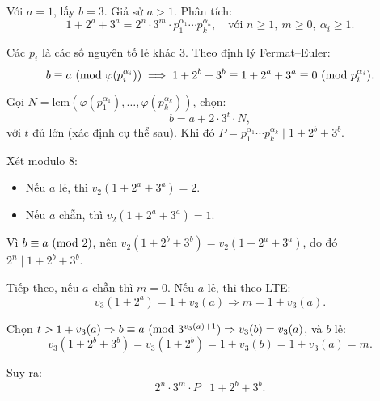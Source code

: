 \documentclass[../09-contruction-methods.tex]{subfiles}
\begin{document}

\newpage

\begin{soln}\footnotemark
    Với \( a = 1 \), lấy \( b = 3 \). Giả sử \( a > 1 \). Phân tích:
    \[
        1 + 2^a + 3^a = 2^n \cdot 3^m \cdot p_1^{\alpha_1} \cdots p_k^{\alpha_k}, \quad \text{với } n \ge 1,\ m \ge 0,\ \alpha_i \ge 1.
    \]

    Các \( p_i \) là các số nguyên tố lẻ khác \( 3 \). Theo định lý Fermat–Euler:
    \[
        b \equiv a \ (\mathrm{mod}\ \varphi(p_i^{\alpha_i})) \implies 1 + 2^b + 3^b \equiv 1 + 2^a + 3^a \equiv 0 \ (\mathrm{mod}\ p_i^{\alpha_i}).
    \]

    Gọi \( N = \text{lcm}(\varphi(p_1^{\alpha_1}), \dots, \varphi(p_k^{\alpha_k})) \), chọn:
    \[
        b = a + 2 \cdot 3^t \cdot N,
    \]
    với \( t \) đủ lớn (xác định cụ thể sau). Khi đó \( P = p_1^{\alpha_1} \cdots p_k^{\alpha_k} \mid 1 + 2^b + 3^b \).

    Xét modulo 8:
    \begin{itemize}[topsep=0pt, partopsep=0pt, itemsep=0pt]
        \item Nếu \( a \) lẻ, thì \( v_2(1 + 2^a + 3^a) = 2 \).
        \item Nếu \( a \) chẵn, thì \( v_2(1 + 2^a + 3^a) = 1 \).
    \end{itemize}

    Vì \( b \equiv a \ (\mathrm{mod}\ 2) \), nên \( v_2(1 + 2^b + 3^b) = v_2(1 + 2^a + 3^a) \), do đó \( 2^n \mid 1 + 2^b + 3^b \).

    Tiếp theo, nếu \( a \) chẵn thì \( m = 0 \). Nếu \( a \) lẻ, thì theo LTE:
    \[
        v_3(1 + 2^a) = 1 + v_3(a) \Rightarrow m = 1 + v_3(a).
    \]

    Chọn \( t > 1 + v_3(a) \Rightarrow b \equiv a \ (\mathrm{mod}\ 3^{v_3(a)+1}) \Rightarrow v_3(b) = v_3(a) \), và \( b \) lẻ:
    \[
        v_3(1 + 2^b + 3^b) = v_3(1 + 2^b) = 1 + v_3(b) = 1 + v_3(a) = m.
    \]

    Suy ra:
    \[
        2^n \cdot 3^m \cdot P \mid 1 + 2^b + 3^b.
    \]
\end{soln}

\end{document}
